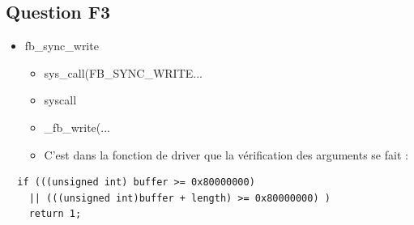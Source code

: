 \documentclass[10pt]{article}
\begin{document}
\subsection{Question F3}
\begin{itemize}
  \item fb\_sync\_write
  \begin{itemize}
    \item sys\_call(FB\_SYNC\_WRITE...
    \item syscall
    \item \_fb\_write(...
    \item C'est dans la fonction de driver que la vérification des
    arguments se fait :\\
  \end{itemize}
\end{itemize}
\begin{lstlisting}
  if (((unsigned int) buffer >= 0x80000000)
    || (((unsigned int)buffer + length) >= 0x80000000) )
    return 1;
\end{lstlisting}

\newpage


\end{document}
